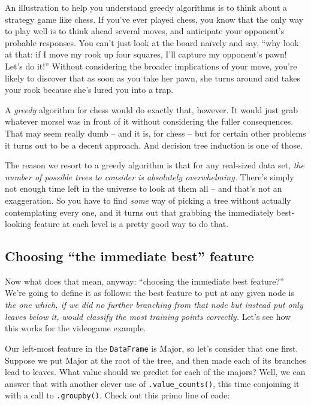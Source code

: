 
An illustration to help you understand greedy algorithms is to think about a
strategy game like chess. If you've ever played chess, you know that the only
way to play well is to think ahead several moves, and anticipate your
opponent's probable responses. You can't just look at the board na\"{i}vely and
say, ``why look at that: if I move my rook up four squares, I'll capture my
opponent's pawn! Let's do it!'' Without considering the broader implications of
your move, you're likely to discover that as soon as you take her pawn, she
turns around and takes your rook because she's lured you into a trap.

A \textit{greedy} algorithm for chess would do exactly that, however. It would
just grab whatever morsel was in front of it without considering the fuller
consequences. That may seem really dumb -- and it is, for chess -- but for
certain other problems it turns out to be a decent approach. And decision tree
induction is one of those.

The reason we resort to a greedy algorithm is that for any real-sized data set,
\textit{the number of possible trees to consider is absolutely overwhelming.}
There's simply not enough time left in the universe to look at them all -- and
that's not an exaggeration. So you have to find \textit{some} way of picking a
tree without actually contemplating every one, and it turns out that grabbing
the immediately best-looking feature at each level is a pretty good way to do
that.

\subsection{Choosing ``the immediate best'' feature}

Now what does that mean, anyway: ``choosing the immediate best feature?'' We're
going to define it as follows: the best feature to put at any given node is
\textit{the one which, if we did no further branching from that node but
instead put only leaves below it, would classify the most training points
correctly.} Let's see how this works for the videogame example.


Our left-most feature in the \texttt{DataFrame} is \textsf{Major}, so let's
consider that one first. Suppose we put \textsf{Major} at the root of the tree,
and then made each of its branches lead to leaves. What value should we predict
for each of the majors? Well, we can answer that with another clever use of
\texttt{.value\_counts()}, this time conjoining it with a call to
\texttt{.groupby()}. Check out this primo line of code:

